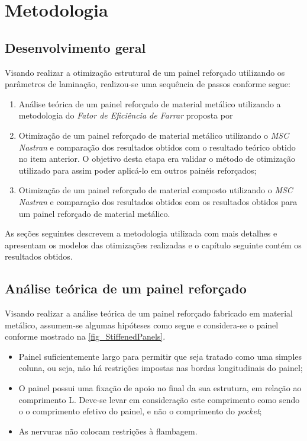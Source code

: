  \chapter[Metodologia]{Metodologia}

 \section{Desenvolvimento geral}
Visando realizar a otimização estrutural de um painel reforçado utilizando os parâmetros de laminação, realizou-se uma sequência de passos conforme segue:
\begin{enumerate}
  \item Análise teórica de um painel reforçado de material metálico utilizando a metodologia do \emph{Fator de Eficiência de Farrar} proposta por \cite{niu1997airframe}
  \item Otimização de um painel reforçado de material metálico utilizando o \emph{MSC Nastran} e comparação dos resultados obtidos com o resultado teórico obtido no item anterior. O objetivo desta etapa era validar o método de otimização utilizado para assim poder aplicá-lo em outros painéis reforçados;
  \item Otimização de um painel reforçado de material composto utilizando o \emph{MSC Nastran} e comparação dos resultados obtidos com os resultados obtidos para um painel reforçado de material metálico.
\end {enumerate}

As seções seguintes descrevem a metodologia utilizada com mais detalhes e apresentam os modelos das otimizações realizadas e o capítulo seguinte contém os resultados obtidos.

\section{Análise teórica de um painel reforçado}
Visando realizar a análise teórica de um painel reforçado fabricado em material metálico, assumem-se algumas hipóteses como segue e considera-se o painel conforme mostrado na \autoref{fig_StiffenedPanels}.

\begin{itemize}
\item Painel suficientemente largo para permitir que seja tratado como uma simples coluna, ou seja, não há restrições impostas nas bordas longitudinais do painel;
\item O painel possui uma fixação de apoio no final da sua estrutura, em relação ao comprimento L. Deve-se levar em consideração este comprimento como sendo o o comprimento efetivo do painel, e não o comprimento do \emph{pocket};
\item As nervuras não colocam restrições à flambagem.
\end{itemize}

